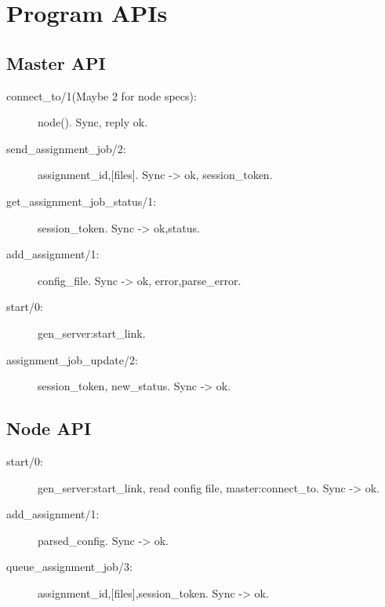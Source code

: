 \section*{Program APIs}
\subsection*{Master API}
\begin{description}
  \item[connect\_to/1(Maybe 2 for node specs):] node(). Sync, reply ok.
  \item[send\_assignment\_job/2:] assignment\_id,[files]. Sync -> {ok, session\_token}.
  \item[get\_assignment\_job\_status/1:] session\_token. Sync -> {ok,status}.
  \item[add\_assignment/1:] config\_file. Sync -> ok, {error,parse\_error}.
  \item[start/0:] gen\_server:start\_link.
  \item[assignment\_job\_update/2:] session\_token, new\_status. Sync -> ok. 
\end{description}
\subsection*{Node API}
\begin{description}
    \item[start/0:] gen\_server:start\_link, read config file, master:connect\_to. Sync -> ok.
    \item[add\_assignment/1:] parsed\_config. Sync -> ok.
    \item[queue\_assignment\_job/3:] assignment\_id,[files],session\_token. Sync -> ok.
\end{description}